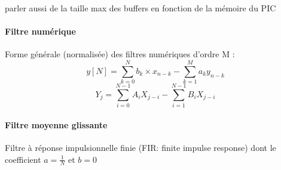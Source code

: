 \documentclass{article}
\begin{document}










    parler aussi de la taille max des buffers en fonction de la mémoire du PIC


    \paragraph{Filtre numérique}
    Forme générale (normalisée) des filtres numériques d'ordre M :
    $$ y[N] = \sum\limits_{k=0}^{N} b_k \times x_{n-k} - \sum\limits_{k=1}^{M} a_k y_{n-k} $$
    $$ Y_j = \sum\limits_{i=0}^{N-1} A_i X_{j-i} - \sum\limits_{i=1}^{N-1} B_i X_{j-i} $$

    \paragraph{Filtre moyenne glissante}
    Filtre à réponse impulsionnelle finie (FIR: finite impulse response) dont le coefficient $a = \frac{1}{N}$ et $b = 0$
\end{document}
